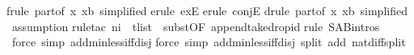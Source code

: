\begin{isabellebody}
frule\ part{}{\isacharbrackleft}of\ {\isachardoublequote}{\isacharpercent}x{\isachardot}\ x{\isacharequal}b{\isachardoublequote}{\isacharcomma}\ simplified{\isacharbrackright}{\isacharparenright}\isanewline
{}erule\ exE{\isacharparenright}\isanewline
{}erule\ conjE{\isacharparenright}\isanewline
{}drule\ part{}{\isacharbrackleft}of\ {\isachardoublequote}{\isacharpercent}x{\isachardot}\ x{\isacharequal}b{\isachardoublequote}{\isacharcomma}\ simplified{\isacharbrackright}{\isacharparenright}\isanewline
\ assumption{\isacharparenright}\isanewline
{}rule{\isacharunderscore}tac\ n{}{\isacharequal}i\ \ t{\isacharequal}list\ \ subst{\isacharbrackleft}OF\ append{\isacharunderscore}take{\isacharunderscore}drop{\isacharunderscore}id{\isacharbrackright}{\isacharparenright}\isanewline
{}rule\ S{\isacharunderscore}A{\isacharunderscore}B{\isachardot}intros{\isacharparenright}\isanewline
\ force\ simp\ add{\isacharcolon}min{\isacharunderscore}less{\isacharunderscore}iff{\isacharunderscore}disj{\isacharparenright}\isanewline
{}force\ simp\ add{\isacharcolon}min{\isacharunderscore}less{\isacharunderscore}iff{\isacharunderscore}disj\ split\ add{\isacharcolon}\ nat{\isacharunderscore}diff{\isacharunderscore}split{\isacharparenright}\isanewline
\isanewline
{}\isanewline
\end{isabellebody}%
